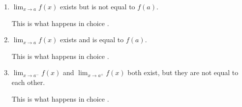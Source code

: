 \documentclass{article}
\begin{document}
\begin{enumerate}
\begin{enumerate}
\begin{enumerate}
      \begin{solution}
        $f$ has a vertical asymptote, choice .
      \end{solution}

    \item

      \begin{problem}[\vfill]
        $\displaystyle \lim_{x \to a} f(x)$ exists but is not equal to
        $f(a)$.
      \end{problem}

      \begin{solution}
        This is what happens in choice . 
      \end{solution}

    \item
      \begin{problem}[\vfill]
        $\displaystyle \lim_{x \to a} f(x)$ exists and is equal to
        $f(a)$. 
      \end{problem}

      \begin{solution}
        This is what happens in choice .
      \end{solution}

    \item
      \begin{problem}[\vfill]
        $\displaystyle \lim_{x \to a^-} f(x)$ and $\displaystyle \lim_{x
          \to a^+} f(x)$ both exist, but they are not equal to each other.
      \end{problem}

      \begin{solution}
        This is what happens in choice .
      \end{solution}

    \end{enumerate}
    \end{enumerate}


\end{enumerate}
\end{document}
